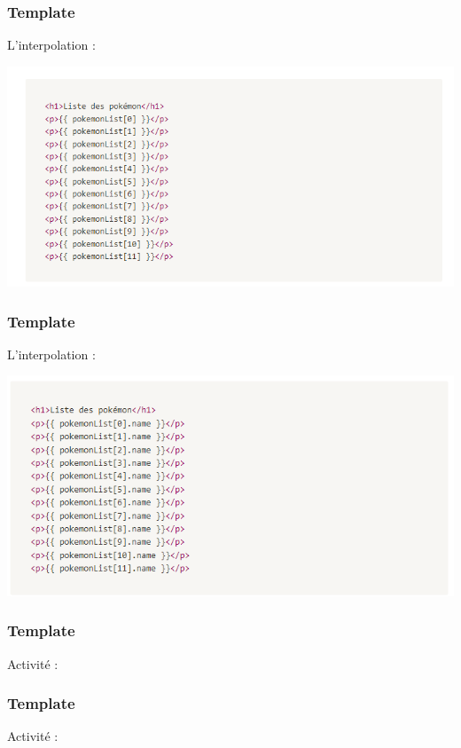 \documentclass[10pt]{beamer}
\begin{document}
	\begin{frame}
		\frametitle{Template}

		L'interpolation : \newline


		\centering
		\includegraphics[width=14cm]{assets/inter} \newline


	\end{frame}

	\begin{frame}
		\frametitle{Template}

		L'interpolation : \newline

		\centering
		\includegraphics[width=14cm]{assets/inter2} \newline


	\end{frame}

	\begin{frame}
		\frametitle{Template}

		Activité : \newline \newline


	\end{frame}

	\begin{frame}
		\frametitle{Template}

		Activité : \newline \newline


	\end{frame}
\end{document}
